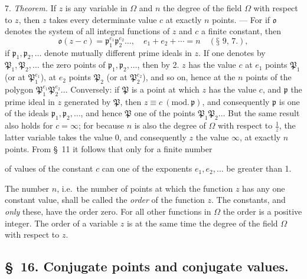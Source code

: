 \documentclass{article}
\begin{document}
7. \emph{Theorem.} If $z$ is any variable in $\Omega$ and $n$ the degree of the field $\Omega$ with respect to $z$, then $z$ takes every determinate value $c$ at exactly $n$ points. --- For if $\mathfrak{o}$ denotes the system of all integral functions of $z$ and $c$ a finite constant, then
\[ \mathfrak{o}(z-c) = \mathfrak{p}_{1}^{e_{1}}\mathfrak{p}_{2}^{e_{2}}\ldots, \quad e_{1} + e_{2} + \cdots = n \quad (\text{§~9, 7.}), \]
if $\mathfrak{p}_{1}, \mathfrak{p}_{2}, \ldots$ denote mutually different prime ideals in $z$. If one denotes by $\mathfrak{P}_{1}, \mathfrak{P}_{2}, \ldots$ the zero points of $\mathfrak{p}_{1}, \mathfrak{p}_{2}, \ldots$, then by 2. $z$ has the value $c$ at $e_{1}$ points $\mathfrak{P}_{1}$ (or at $\mathfrak{P}_{1}^{e_{1}}$), at $e_{2}$ points $\mathfrak{P}_{2}$ (or at $\mathfrak{P}_{2}^{e_{2}}$), and so on, hence at the $n$ points of the polygon $\mathfrak{P}_{1}^{e_{1}}\mathfrak{P}_{2}^{e_{2}}\ldots$ Conversely: if $\mathfrak{P}$ is a point at which $z$ has the value $c$, and $\mathfrak{p}$ the prime ideal in $z$ generated by $\mathfrak{P}$, then $z \equiv c \ (\text{mod.}\,\mathfrak{p})$, and consequently $\mathfrak{p}$ is one of the ideals $\mathfrak{p}_{1}, \mathfrak{p}_{2}, \ldots$, and hence $\mathfrak{P}$ one of the points $\mathfrak{P}_{1}\mathfrak{P}_{2}\ldots$ But the same result also holds for $c = \infty$; for because $n$ is also the degree of $\Omega$ with respect to $\frac{1}{z}$, the latter variable takes the value 0, and consequently $z$ the value $\infty$, at exactly $n$ points. From §~11 it follows that only for a finite number

of values of the constant $c$ can one of the exponents $e_{1}, e_{2}, \ldots$ be greater than 1.

The number $n$, i.e.\ the number of points at which the function $z$ has any one constant value, shall be called the \emph{order} of the function $z$. The constants, and \emph{only} these, have the order zero. For all other functions in $\Omega$ the order is a positive integer. The order of a variable $z$ is at the same time the degree of the field $\Omega$ with respect to $z$.

\subsection*{§~16. Conjugate points and conjugate values.}
\end{document}
